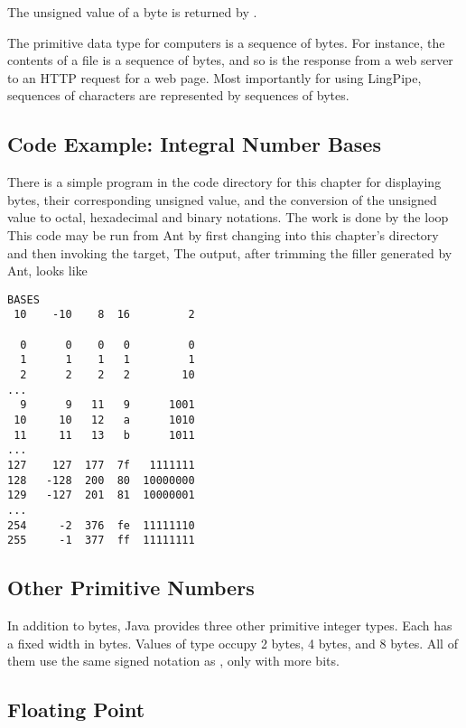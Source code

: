 The unsigned value of a byte  is returned by .  

The primitive data type for computers is a sequence of bytes.  For
instance, the contents of a file is a sequence of bytes, and so
is the response from a web server to an HTTP request for a web page.
Most importantly for using LingPipe, sequences of characters are
represented by sequences of bytes.

\subsection{Code Example: Integral Number Bases}

There is a simple program in the code directory for this chapter
%
%
for displaying bytes, their corresponding unsigned value, and the
conversion of the unsigned value to octal, hexadecimal and binary
notations.  The work is done by the loop
%
%
This code may be run from Ant by first changing into this chapter's
directory and then invoking the \code{byte-table} target,
%
%
%
The output, after trimming the filler generated by Ant, looks like
%
\begin{verbatim}
BASES
 10    -10    8  16         2

  0      0    0   0         0
  1      1    1   1         1
  2      2    2   2        10
...
  9      9   11   9      1001
 10     10   12   a      1010
 11     11   13   b      1011
...
127    127  177  7f   1111111
128   -128  200  80  10000000
129   -127  201  81  10000001
...
254     -2  376  fe  11111110
255     -1  377  ff  11111111
\end{verbatim}

\subsection{Other Primitive Numbers}

In addition to bytes, Java provides three other primitive integer
types.  Each has a fixed width in bytes.  Values of type 
occupy 2 bytes, \code{int} 4 bytes, and \code{long} 8 bytes.  All of
them use the same signed notation as \code{byte}, only with more bits.

\subsection{Floating Point}

